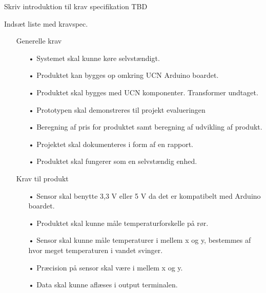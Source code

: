 Skriv introduktion til krav specifikation TBD

Indsæt liste med kravspec.
\begin{enumerate}
\item[]Generelle krav
\begin{enumerate}
	\item[•]Systemet skal kunne køre selvstændigt.
	\item[•]Produktet kan bygges op omkring UCN Arduino boardet. 
	\item[•]Produktet skal bygges med UCN komponenter. Transformer undtaget.
	\item[•]Prototypen skal demonstreres til projekt evalueringen 
	\item[•]Beregning af pris for produktet samt beregning af udvikling af       produkt.
	\item[•]Projektet skal dokumenteres i form af en rapport.
	\item[•]Produktet skal fungerer som en selvstændig enhed.
\end{enumerate}	

\item[]Krav til produkt
\begin{enumerate}
	\item[•]Sensor skal benytte 3,3 V eller 5 V da det er kompatibelt med Arduino boardet.
	\item[•]Produktet skal kunne måle temperaturforskelle på rør.
	\item[•]Sensor skal kunne måle temperaturer i mellem x og y, bestemmes af hvor meget temperaturen i vandet svinger.
	\item[•]Præcision på sensor skal være i mellem x og y.
	\item[•]Data skal kunne aflæses i output terminalen.
\end{enumerate}	
\end{enumerate}	